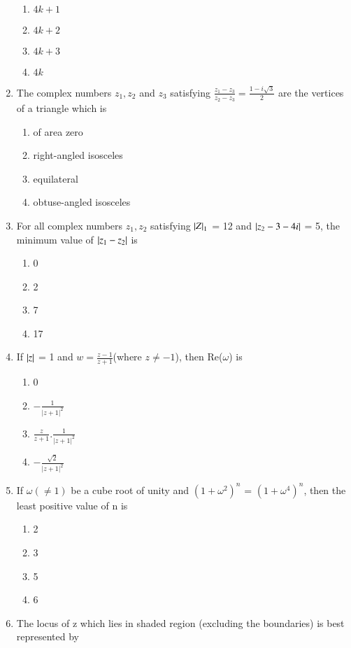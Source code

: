 \begin{enumerate}[label=\arabic*.,ref=\thesubsection.\theenumi]
    \begin{enumerate}
    \item   $4k+1$
    \item   $4k+2$
    \item   $4k+3$
    \item   $4k$
    \end{enumerate}
    \item  The complex numbers $z_1, z_2$ and $z_3$ satisfying
    $\frac{z_1-z_3}{z_2-z_3} = \frac{1-i\sqrt3}{2}$ are the vertices of a triangle which is
    \begin{enumerate}
    \item   of area zero
    \item   right-angled isosceles
    \item   equilateral
    \item   obtuse-angled isosceles
    \end{enumerate}
    \item For all complex numbers $z_1, z_2$ satisfying $\left\vert Z\right\vert_1$ = 12 and $\left\vert z_2-3-4i\right\vert$ = 5, the minimum value of  $\left\vert z_1-z_2\right\vert$ is
    \begin{enumerate}
    \item   0
    \item   2
    \item   7
    \item   17
    \end{enumerate}
    \item If $\left\vert z\right\vert$ = 1 and $w = \frac{z-1}{z+1}$(where $z \neq -1$), then Re($\omega$) is
    \begin{enumerate}
    \item   0
    \item   $-\frac{1}{\vert z+1\vert ^2}$
    \item   $\frac{z}{z+1}.\frac{1}{\vert z+1\vert ^2}$
    \item   $-\frac{\sqrt 2}{\vert z+1\vert ^2}$
    \end{enumerate}
    \item If $\omega(\neq1)$ be a cube root of unity and $(1+\omega^2)^n$ = $(1+\omega^4)^n$, then the least positive value of n is
    \begin{enumerate}
    \item   2
    \item   3
    \item   5
    \item   6
    \end{enumerate}
    \item The locus of z which lies in shaded region (excluding the boundaries) is best represented by 

\end{enumerate}
